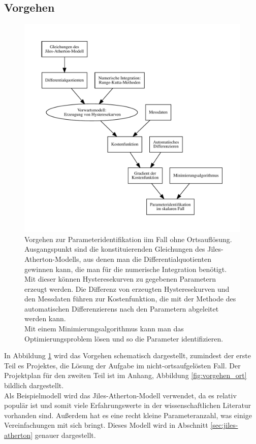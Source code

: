 \documentclass{scrartcl}
\begin{document}
\subsection{Vorgehen}
\begin{figure}
\caption{Vorgehen zur Parameteridentifikation iim Fall ohne Ortsauflösung.\\Ausgangspunkt sind die konstituierenden Gleichungen des Jiles-Atherton-Modells, aus denen man die Differentialquotienten gewinnen kann, die man für die numerische Integration benötigt.\\
Mit dieser können Hysteresekurven zu gegebenen Parametern erzeugt werden. Die Differenz von erzeugten Hysteresekurven und den Messdaten führen zur Kostenfunktion, die mit der Methode des automatischen Differenzierens nach den Parametern abgeleitet werden kann.\\
Mit einem Minimierungsalgorithmus kann man das Optimierungsproblem lösen und so die Parameter identifizieren.}
\label{fig:vorgehen_skalar}

\includegraphics[width=\textwidth]{vorgehen.pdf}

\end{figure}
In Abbildung \ref{fig:vorgehen_skalar} wird das Vorgehen schematisch dargestellt, zumindest der erste Teil es Projektes, die Lösung der Aufgabe im nicht-ortsaufgelösten Fall. Der Projektplan für den zweiten Teil ist im Anhang, Abbildung \ref{fig:vorgehen_ort} bildlich dargestellt.\\
Als Beispielmodell wird das Jiles-Atherton-Modell verwendet, da es relativ populär ist und somit viele Erfahrungswerte in der wissenschaftlichen Literatur vorhanden sind. Außerdem hat es eine recht kleine Parameteranzahl, was einige Vereinfachungen mit sich bringt. Dieses Modell wird in Abschnitt \ref{sec:jiles-atherton} genauer dargestellt.\\
\end{document}
